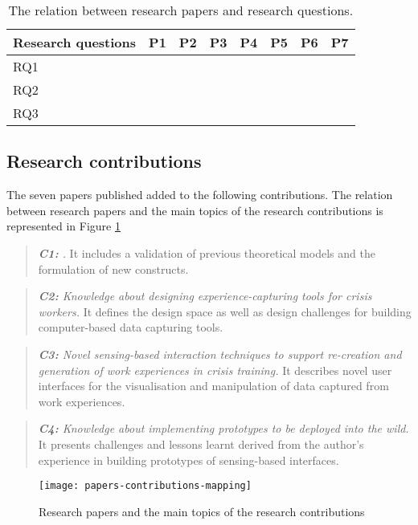 \begin{table}
	[tbh] \centering \caption{The relation between research papers and research questions.} \label{tab:rq-papers-relation} 
	\begin{tabular}
		{p{}p{}ccccccc} \toprule \multicolumn{2}{l}{Research questions} & P1 & P2 & P3 & P4 & P5 & P6 & P7 \\
		\midrule RQ1 & \RQi & & \textbullet & \textbullet & & & \textbullet & \\
		RQ2 & \RQii & \textbullet & \textbullet & & \textbullet & \textbullet & \textbullet & \\
		RQ3 & \RQiii & & & \textbullet & & \textbullet & & \textbullet \\
		\bottomrule 
	\end{tabular}
\end{table}

\subsection{Research contributions}\label{research-contributions}

The seven papers published added to the following contributions. The relation between research papers and the main topics of the research contributions is represented in Figure \ref{fig:mapping}
\begin{quote}
	\emph{\textbf{C1:} \Ci.} It includes a validation of previous theoretical models and the formulation of new constructs. 
\end{quote}
\begin{quote}
	\emph{\textbf{C2:} Knowledge about designing experience-capturing tools for crisis workers.} It defines the design space as well as design challenges for building computer-based data capturing tools. 
\end{quote}
\begin{quote}
	\emph{\textbf{C3:} Novel sensing-based interaction techniques to support re-creation and generation of work experiences in crisis training.} It describes novel user interfaces for the visualisation and manipulation of data captured from work experiences. 
\end{quote}
\begin{quote}
	\emph{\textbf{C4:} Knowledge about implementing prototypes to be deployed into the wild.} It presents challenges and lessons learnt derived from the author's experience in building prototypes of sensing-based interfaces. 
\end{quote}
\begin{figure}
	[tb] \centering 
	\texttt{[image: papers-contributions-mapping]} \caption{Research papers and the main topics of the research contributions} \label{fig:mapping} 
\end{figure}

